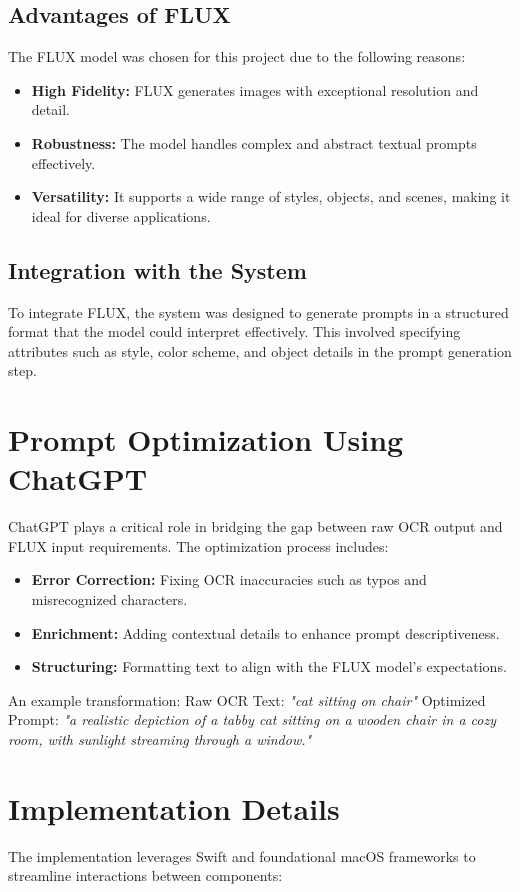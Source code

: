 \subsection{Advantages of FLUX}
The FLUX model was chosen for this project due to the following reasons:
\begin{itemize}
    \item \textbf{High Fidelity:} FLUX generates images with exceptional resolution and detail.
    \item \textbf{Robustness:} The model handles complex and abstract textual prompts effectively.
    \item \textbf{Versatility:} It supports a wide range of styles, objects, and scenes, making it ideal for diverse applications.
\end{itemize}

\subsection{Integration with the System}
To integrate FLUX, the system was designed to generate prompts in a structured format that the model could interpret effectively. This involved specifying attributes such as style, color scheme, and object details in the prompt generation step.

\section{Prompt Optimization Using ChatGPT}
ChatGPT plays a critical role in bridging the gap between raw OCR output and FLUX input requirements. The optimization process includes:
\begin{itemize}
    \item \textbf{Error Correction:} Fixing OCR inaccuracies such as typos and misrecognized characters.
    \item \textbf{Enrichment:} Adding contextual details to enhance prompt descriptiveness.
    \item \textbf{Structuring:} Formatting text to align with the FLUX model's expectations.
\end{itemize}
An example transformation:\newline
Raw OCR Text: \textit{"cat sitting on chair"}\newline
Optimized Prompt: \textit{"a realistic depiction of a tabby cat sitting on a wooden chair in a cozy room, with sunlight streaming through a window."}

\section{Implementation Details}
The implementation leverages Swift and foundational macOS frameworks to streamline interactions between components:
